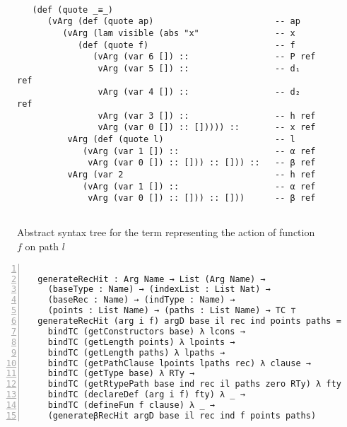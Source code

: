 \documentclass[sigplan,10pt]{acmart}
\begin{document}
\begin{figure}
\begin{center}
\begingroup
\fontsize{7pt}{9pt}\selectfont
\begin{Verbatim}[frame = single]

   (def (quote _≡_) 
      (vArg (def (quote ap)                        -- ap
         (vArg (lam visible (abs "x"               -- x
            (def (quote f)                         -- f
               (vArg (var 6 []) ::                 -- P ref
                vArg (var 5 []) ::                 -- d₁ ref
                vArg (var 4 []) ::                 -- d₂ ref
                vArg (var 3 []) ::                 -- h ref
                vArg (var 0 []) :: [])))) ::       -- x ref
          vArg (def (quote l)                      -- l
             (vArg (var 1 []) ::                   -- α ref
              vArg (var 0 []) :: [])) :: [])) ::   -- β ref
          vArg (var 2                              -- h ref
             (vArg (var 1 []) ::                   -- α ref
              vArg (var 0 []) :: [])) :: []))      -- β ref
             
\end{Verbatim}
\endgroup
\end{center}
\caption{Abstract syntax tree for the term representing the action of function $f$ on path $l$}
\label{fig:ast-beta-f}
\end{figure}

\begin{center}
\begingroup
\fontsize{7pt}{9pt}\selectfont
\begin{Verbatim}[frame = lines, rulecolor=\color{blue}, numbers = left, numbersep = 0pt]

  generateRecHit : Arg Name → List (Arg Name) → 
    (baseType : Name) → (indexList : List Nat) → 
    (baseRec : Name) → (indType : Name) → 
    (points : List Name) → (paths : List Name) → TC ⊤
  generateRecHit (arg i f) argD base il rec ind points paths =
    bindTC (getConstructors base) λ lcons → 
    bindTC (getLength points) λ lpoints →
    bindTC (getLength paths) λ lpaths →
    bindTC (getPathClause lpoints lpaths rec) λ clause →
    bindTC (getType base) λ RTy →
    bindTC (getRtypePath base ind rec il paths zero RTy) λ fty →
    bindTC (declareDef (arg i f) fty) λ _ →
    bindTC (defineFun f clause) λ _ →
    (generateβRecHit argD base il rec ind f points paths)

\end{Verbatim}
\endgroup
\end{center}
\end{document}
